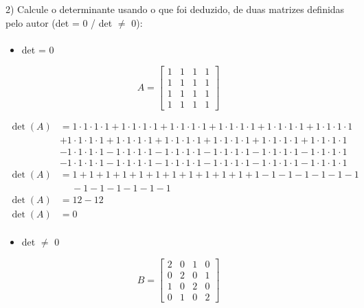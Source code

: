\documentclass[12pt]{article}
\begin{document}
2) Calcule o determinante usando o que foi deduzido, de duas matrizes definidas pelo autor (det = 0 / det $\neq$ 0):

\paragraph{}
\begin{itemize}
    \item det = 0
\end{itemize}

\[
  A =
  \left[ {\begin{array}{cccc}
    1 & 1 & 1 & 1\\
    1 & 1 & 1 & 1\\
    1 & 1 & 1 & 1\\
    1 & 1 & 1 & 1
  \end{array} } \right]
\]

\[
\begin{aligned}
    \operatorname{det}(A) & = 1 \cdot 1 \cdot 1 \cdot 1 + 1 \cdot 1 \cdot 1 \cdot 1 + 1 \cdot 1 \cdot 1 
    \cdot 1 + 1 \cdot 1 \cdot 1 \cdot 1 + 1 \cdot 1 \cdot 1 \cdot 1 + 1 \cdot 1 \cdot 1 \cdot 1\\
    & + 1 \cdot 1 \cdot 1 \cdot 1 + 1 \cdot 1 \cdot 1 \cdot 1 + 1 \cdot 1 \cdot 1 \cdot 1 + 1 \cdot 1 
    \cdot 1 \cdot 1 + 1 \cdot 1 \cdot 1 \cdot 1 + 1 \cdot 1 \cdot 1 \cdot 1\\
    & - 1 \cdot 1 \cdot 1 \cdot 1 - 1 \cdot 1 \cdot 1 \cdot 1 - 1 \cdot 1 \cdot 1 \cdot 1 - 1 \cdot 1 
    \cdot 1 \cdot 1 - 1 \cdot 1 \cdot 1 \cdot 1 - 1 \cdot 1 \cdot 1 \cdot 1\\
    & - 1 \cdot 1 \cdot 1 \cdot 1 - 1 \cdot 1 \cdot 1 \cdot 1 - 1 \cdot 1 \cdot 1 \cdot 1 - 1 \cdot 1 
    \cdot 1 \cdot 1 - 1 \cdot 1 \cdot 1 \cdot 1 - 1 \cdot 1 \cdot 1 \cdot 1 \\ 
    \operatorname{det}(A) & = 1 + 1 + 1 + 1 + 1 + 1 + 1 + 1 + 1 + 1 + 1 + 1 - 1 - 1 - 1 - 1 - 1 - 1  \\ 
    & \quad \ - 1  - 1 - 1 - 1 - 1 - 1 \\
    \operatorname{det}(A) & = 12-12 \\
    \operatorname{det}(A) & = 0
\end{aligned}
\]


\paragraph{}
\begin{itemize}
    \item det $\neq$ 0
\end{itemize}
\[
  B =
  \left[ {\begin{array}{cccc}
    2 & 0 & 1 & 0\\
    0 & 2 & 0 & 1\\
    1 & 0 & 2 & 0\\
    0 & 1 & 0 & 2
  \end{array} } \right]
\]
\end{document}
